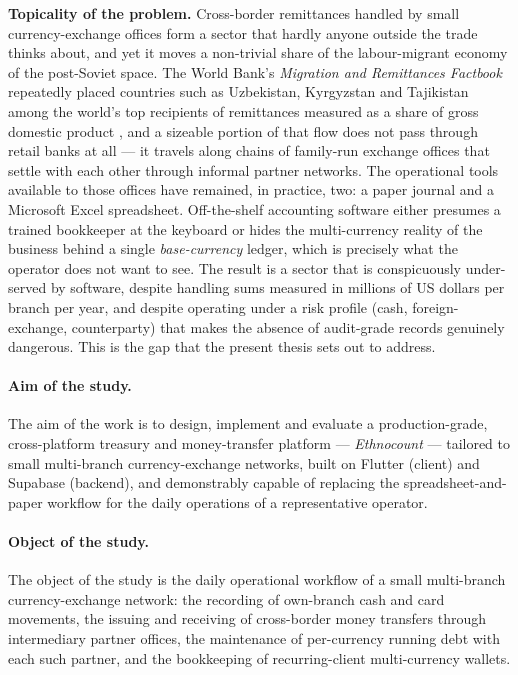 
\noindent\textbf{Topicality of the problem.}
Cross-border remittances handled by small currency-exchange offices form a sector that hardly anyone outside the trade thinks about, and yet it moves a non-trivial share of the labour-migrant economy of the post-Soviet space. The World Bank's \emph{Migration and Remittances Factbook} repeatedly placed countries such as Uzbekistan, Kyrgyzstan and Tajikistan among the world's top recipients of remittances measured as a share of gross domestic product \cite{ratha2016}, and a sizeable portion of that flow does not pass through retail banks at all --- it travels along chains of family-run exchange offices that settle with each other through informal partner networks. The operational tools available to those offices have remained, in practice, two: a paper journal and a Microsoft Excel spreadsheet. Off-the-shelf accounting software either presumes a trained bookkeeper at the keyboard or hides the multi-currency reality of the business behind a single \emph{base-currency} ledger, which is precisely what the operator does not want to see. The result is a sector that is conspicuously under-served by software, despite handling sums measured in millions of US dollars per branch per year, and despite operating under a risk profile (cash, foreign-exchange, counterparty) that makes the absence of audit-grade records genuinely dangerous. This is the gap that the present thesis sets out to address.

\paragraph{Aim of the study.}
The aim of the work is to design, implement and evaluate a production-grade, cross-platform treasury and money-transfer platform --- \emph{Ethnocount} --- tailored to small multi-branch currency-exchange networks, built on Flutter (client) and Supabase (backend), and demonstrably capable of replacing the spreadsheet-and-paper workflow for the daily operations of a representative operator.

\paragraph{Object of the study.}
The object of the study is the daily operational workflow of a small multi-branch currency-exchange network: the recording of own-branch cash and card movements, the issuing and receiving of cross-border money transfers through intermediary partner offices, the maintenance of per-currency running debt with each such partner, and the bookkeeping of recurring-client multi-currency wallets.

